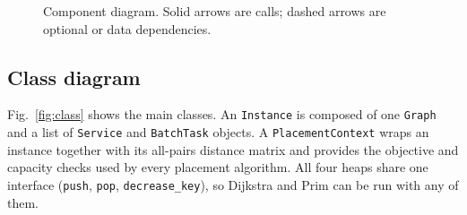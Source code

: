 \begin{figure}[!htbp]
\caption{Component diagram. Solid arrows are calls; dashed arrows are optional or data dependencies.}\label{fig:component}
\end{figure}

\subsection{Class diagram}
Fig.~\ref{fig:class} shows the main classes. An \texttt{Instance} is composed of one \texttt{Graph} and a list of \texttt{Service} and \texttt{BatchTask} objects. A \texttt{PlacementContext} wraps an instance together with its all-pairs distance matrix and provides the objective and capacity checks used by every placement algorithm. All four heaps share one interface (\texttt{push}, \texttt{pop}, \texttt{decrease\_key}), so Dijkstra and Prim can be run with any of them.

